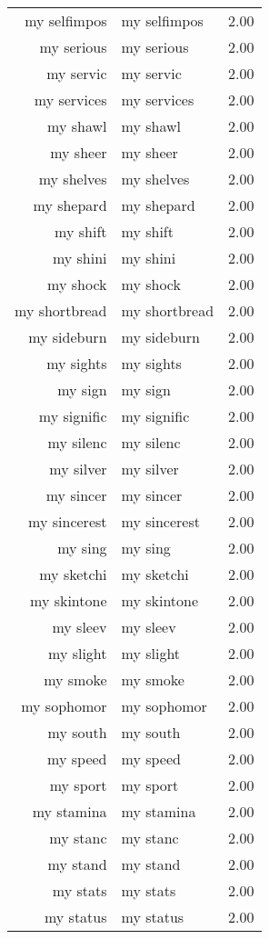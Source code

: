 \begin{table}[ht]
\begin{tabular}{rlr}
  my selfimpos & my selfimpos & 2.00 \\ 
  my serious & my serious & 2.00 \\ 
  my servic & my servic & 2.00 \\ 
  my services & my services & 2.00 \\ 
  my shawl & my shawl & 2.00 \\ 
  my sheer & my sheer & 2.00 \\ 
  my shelves & my shelves & 2.00 \\ 
  my shepard & my shepard & 2.00 \\ 
  my shift & my shift & 2.00 \\ 
  my shini & my shini & 2.00 \\ 
  my shock & my shock & 2.00 \\ 
  my shortbread & my shortbread & 2.00 \\ 
  my sideburn & my sideburn & 2.00 \\ 
  my sights & my sights & 2.00 \\ 
  my sign & my sign & 2.00 \\ 
  my signific & my signific & 2.00 \\ 
  my silenc & my silenc & 2.00 \\ 
  my silver & my silver & 2.00 \\ 
  my sincer & my sincer & 2.00 \\ 
  my sincerest & my sincerest & 2.00 \\ 
  my sing & my sing & 2.00 \\ 
  my sketchi & my sketchi & 2.00 \\ 
  my skintone & my skintone & 2.00 \\ 
  my sleev & my sleev & 2.00 \\ 
  my slight & my slight & 2.00 \\ 
  my smoke & my smoke & 2.00 \\ 
  my sophomor & my sophomor & 2.00 \\ 
  my south & my south & 2.00 \\ 
  my speed & my speed & 2.00 \\ 
  my sport & my sport & 2.00 \\ 
  my stamina & my stamina & 2.00 \\ 
  my stanc & my stanc & 2.00 \\ 
  my stand & my stand & 2.00 \\ 
  my stats & my stats & 2.00 \\ 
  my status & my status & 2.00 \\ 

\end{tabular}
\end{table}
